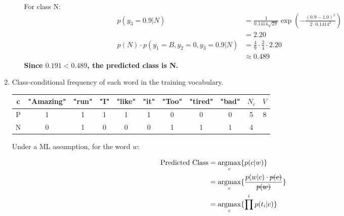 \documentclass{article}
\DeclareMathOperator*{\argmax}{argmax}
\begin{document}
\begin{enumerate}[leftmargin=\labelsep]
\begin{enumerate}
  
  For class N:
  \begin{align*}
  p(y_3=0.9 | N) &= \frac{1}{0.1414 \sqrt{2\pi}} \exp\left(-\frac{(0.9 - 1.0)^2}{2 \cdot 0.1414^2}\right) \\[10pt]
  &= 2.20\\
  p(N) \cdot p(y_1 = B, y_2 = 0, y_3=0.9 | N) &= \frac{4}{9} \cdot \frac{2}{4} \cdot 2.20 \\[10pt]
  &\approx 0.489
  \end{align*}
  \textbf{
  Since $0.191 < 0.489$, the predicted class is N.
  }
\end{enumerate}


\centering
{}

\newpage

\raggedright
\item Class-conditional frequency of each word in the training vocabulary.

\begin{table}[H]
  \centering
  \begin{tabular}{ccccccccccc}
    c & "Amazing" & "run" & "I" & "like" & "it" & "Too" & "tired" & "bad" & $N_c$ & $V$ \\ \midrule
    P & 1 & 1 & 1 & 1 & 1 & 0 & 0 & 0 & 5 & \multirow{2}{*}{8} \\
    N & 0 & 1 & 0 & 0 & 0 & 1 & 1 & 1 & 4 \\
  \end{tabular}
\end{table}

Under a ML assumption, for the word $w$:

\begin{align*}
  \text{Predicted Class} &= \argmax_c \{ p(c|w) \} \\
  &= \argmax_c \{ \frac{p(w|c) \cdot \hbox{\sout{$p(c)$}}}{\hbox{\sout{$p(w)$}}} \} \\
  &= \argmax_c \{ \prod^ip(t_i|c) \}
\end{align*}



\end{enumerate}
\end{document}
